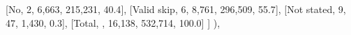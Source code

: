 \documentclass[
  11pt,
  a4paper,
]{article}
\newenvironment{Shaded}{\begin{snugshade}}{\end{snugshade}}
\newcommand{\NormalTok}[1]{\textcolor[rgb]{0.00,0.23,0.31}{#1}}
\newcommand{\StringTok}[1]{\textcolor[rgb]{0.13,0.47,0.30}{#1}}
\begin{document}
\begin{Shaded}
\begin{Highlighting}[]
\NormalTok{                    [}\StringTok{\textquotesingle{}No\textquotesingle{}}\NormalTok{, }\StringTok{\textquotesingle{}2\textquotesingle{}}\NormalTok{, }\StringTok{\textquotesingle{}6,663\textquotesingle{}}\NormalTok{, }\StringTok{\textquotesingle{}215,231\textquotesingle{}}\NormalTok{, }\StringTok{\textquotesingle{}40.4\textquotesingle{}}\NormalTok{],}
\NormalTok{                    [}\StringTok{\textquotesingle{}Valid skip\textquotesingle{}}\NormalTok{, }\StringTok{\textquotesingle{}6\textquotesingle{}}\NormalTok{, }\StringTok{\textquotesingle{}8,761\textquotesingle{}}\NormalTok{, }\StringTok{\textquotesingle{}296,509\textquotesingle{}}\NormalTok{, }\StringTok{\textquotesingle{}55.7\textquotesingle{}}\NormalTok{],}
\NormalTok{                    [}\StringTok{\textquotesingle{}Not stated\textquotesingle{}}\NormalTok{, }\StringTok{\textquotesingle{}9\textquotesingle{}}\NormalTok{, }\StringTok{\textquotesingle{}47\textquotesingle{}}\NormalTok{, }\StringTok{\textquotesingle{}1,430\textquotesingle{}}\NormalTok{, }\StringTok{\textquotesingle{}0.3\textquotesingle{}}\NormalTok{],}
\NormalTok{                    [}\StringTok{\textquotesingle{}Total\textquotesingle{}}\NormalTok{, }\StringTok{\textquotesingle{}\textquotesingle{}}\NormalTok{, }\StringTok{\textquotesingle{}16,138\textquotesingle{}}\NormalTok{, }\StringTok{\textquotesingle{}532,714\textquotesingle{}}\NormalTok{, }\StringTok{\textquotesingle{}100.0\textquotesingle{}}\NormalTok{]}
\NormalTok{                ]}
\NormalTok{            ),}
            

\end{Highlighting}
\end{Shaded}
\end{document}
